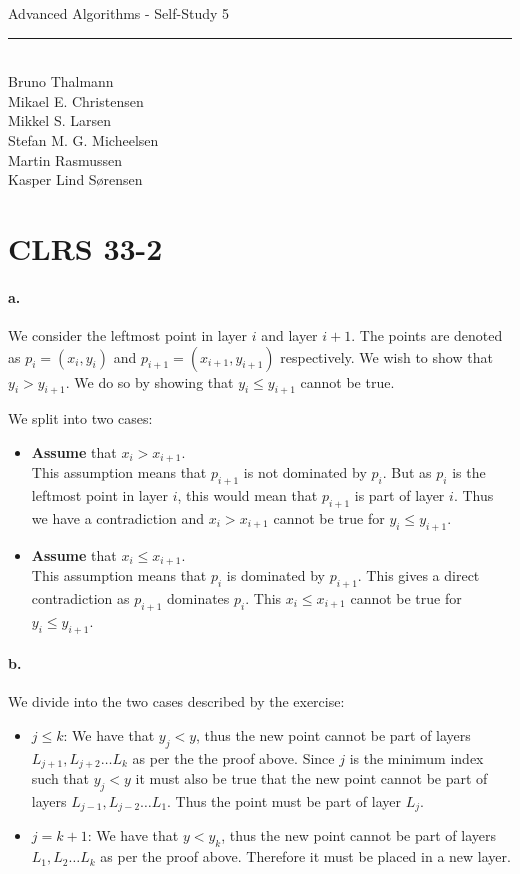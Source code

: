 
\newcommand{\HRule}{\rule{\linewidth}{0.5mm}}


\begin{titlepage}
\centering
{\LARGE Advanced Algorithms - Self-Study 5}
\HRule \\[0.5cm]
Bruno Thalmann\\
			Mikael E. Christensen\\
			Mikkel S. Larsen\\
			Stefan M. G. Micheelsen\\
			Martin Rasmussen\\
			Kasper Lind Sørensen			
\end{titlepage}

\section*{CLRS 33-2}
\paragraph{a.}We consider the leftmost point in layer $i$ and layer $i+1$.
The points are denoted as $p_i = (x_i, y_i)$ and $p_{i +1} = (x_{i +1}, y_{i +1})$ respectively.
We wish to show that $y_i > y_{i +1}$.
We do so by showing that $y_i \leq y_{i +1}$ cannot be true.

We split into two cases:
\begin{itemize}
\item \textbf{Assume} that $x_i > x_{i+1}$.
\\This assumption means that $p_{i+1}$ is not dominated by $p_i$.
But as $p_i$ is the leftmost point in layer $i$, this would mean that $p_{i+1}$ is part of layer $i$.
Thus we have a contradiction and $x_i > x_{i+1}$ cannot be true for $y_i \leq y_{i+1}$.
\item \textbf{Assume} that $x_i \leq x_{i+1}$.
\\This assumption means that $p_i$ is dominated by $p_{i+1}$.
This gives a direct contradiction as $p_{i+1}$ dominates $p_i$.
This $x_i \leq x_{i+1}$ cannot be true for $y_i \leq y_{i+1}$.
\end{itemize}

\paragraph{b.}We divide into the two cases described by the exercise:
\begin{itemize}
\item $j \leq k$: We have that $y_j < y$, thus the new point cannot be part of layers $L_{j+1}, L_{j+2} \dots L_k$ as per the the proof above.
Since $j$ is the minimum index such that $y_j < y$ it must also be true that the new point cannot be part of layers $L_{j-1}, L_{j-2} \dots L_1$.
Thus the point must be part of layer $L_j$.
\item $j = k + 1$: We have that $y < y_k$, thus the new point cannot be part of layers $L_1, L_2 \dots L_k$ as per the proof above.
Therefore it must be placed in a new layer.
\end{itemize}

